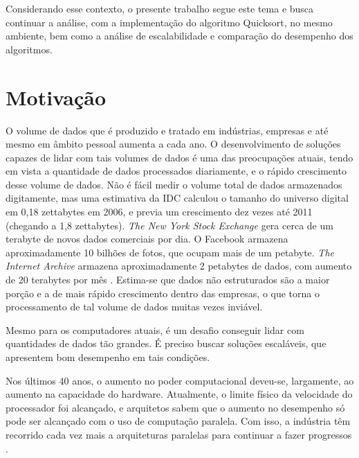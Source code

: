 Considerando esse contexto, o presente trabalho segue este tema e busca continuar a análise, com a implementação do algoritmo Quicksort, no mesmo ambiente, bem como a análise de escalabilidade e comparação do desempenho dos algoritmos.


\section{Motivação}


O volume de dados que é produzido e tratado em indústrias, empresas e até mesmo em âmbito pessoal aumenta a cada ano. O desenvolvimento de soluções capazes de lidar com tais volumes de dados é uma das preocupações atuais, tendo em vista a quantidade de dados processados diariamente, e o rápido crescimento desse volume de dados.
Não é fácil medir o volume total de dados armazenados digitamente, mas uma estimativa da IDC \cite{Gantz:2008} calculou o tamanho do universo digital em 0,18 zettabytes em 2006, e previa um crescimento dez vezes até 2011 (chegando a 1,8 zettabytes).
 \textit{The New York Stock Exchange} gera cerca de um terabyte de novos dados comerciais por dia. O Facebook armazena aproximadamente 10 bilhões de fotos, que ocupam mais de um petabyte. \textit{The Internet Archive} armazena aproximadamente 2 petabytes de dados, com aumento de 20 terabytes por mês
\cite{Hadoop:2010}. Estima-se que dados não estruturados são a maior porção e a de mais rápido crescimento dentro das empresas, o que torna o processamento de tal volume de dados muitas vezes inviável.


Mesmo para os computadores atuais, é um desafio conseguir lidar com quantidades de dados tão grandes. É preciso buscar soluções escaláveis, que apresentem bom desempenho em tais condições. 


Nos últimos 40 anos, o aumento no poder computacional deveu-se, largamente, ao aumento na capacidade do hardware. Atualmente, o limite físico da velocidade do processador foi alcançado, e arquitetos sabem que o aumento no desempenho só pode ser alcançado com o uso de computação paralela. Com isso, a indústria têm recorrido cada vez mais a arquiteturas paralelas para continuar a fazer progressos \cite{Manferdelli:2008}. 


